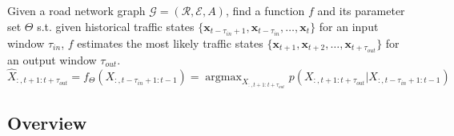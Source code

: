 \begin{problem}
    Given a road network graph $\mathcal{G}=(\mathcal{R}, \mathcal{E}, A)$, find a function $f$ and its parameter set $\Theta$ s.t. given historical traffic states $\{\mathbf{x}_{t-\tau_{in}+1}, \mathbf{x}_{t-\tau_{in}}, \dots, \mathbf{x}_t \}$ for an input window $\tau_{in}$, $f$ estimates the most likely traffic states $\{\mathbf{x}_{t+1}, \mathbf{x}_{t+2}, \dots, \mathbf{x}_{t+\tau_{out}} \}$ for an output window $\tau_{out}$.
    \begin{equation}
        \hat X_{:, t+1:t+\tau_{out}}=f_\Theta(X_{:, t-\tau_{in}+1:t-1})=\mathop{\arg\max}_{X_{:, t+1:t+\tau_{out}}} p(X_{:, t+1:t+\tau_{out}}|X_{:, t-\tau_{in}+1:t-1})
    \end{equation}
\end{problem}

\subsection{Overview}
